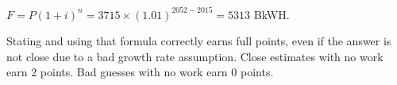 \documentclass[12pts,answers]{exam}
\begin{document}
\begin{questions}
\begin{parts}
\begin{solution}
                 $F = P(1+i)^n = 3715\times(1.01)^{2052-2015} = 5313$ BkWH. 

                 Stating and using that formula correctly earns full points, 
                 even if the answer is not close due to a bad growth rate 
                 assumption. Close estimates with no work earn 2 points.
                 Bad guesses with no work earn 0 points.
        \end{solution}
\end{parts}

\end{questions}



%
%
\end{document}
